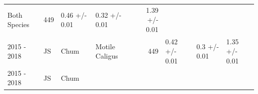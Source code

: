 \documentclass[fleqn,10pt]{wlpeerj} %
\begin{document}
\begin{longtable}[]{@{}llllrlll@{}}
\begin{minipage}[t]{0.11\columnwidth}
Both Species\strut
\end{minipage} & \begin{minipage}[t]{0.04\columnwidth}\raggedleft\strut
449\strut
\end{minipage} & \begin{minipage}[t]{0.14\columnwidth}\raggedright\strut
0.46 +/- 0.01\strut
\end{minipage} & \begin{minipage}[t]{0.14\columnwidth}\raggedright\strut
0.32 +/- 0.01\strut
\end{minipage} & \begin{minipage}[t]{0.14\columnwidth}\raggedright\strut
1.39 +/- 0.01\strut
\end{minipage}\tabularnewline
\begin{minipage}[t]{0.09\columnwidth}\raggedright\strut
2015 - 2018\strut
\end{minipage} & \begin{minipage}[t]{0.06\columnwidth}\raggedright\strut
JS\strut
\end{minipage} & \begin{minipage}[t]{0.06\columnwidth}\raggedright\strut
Chum\strut
\end{minipage} & \begin{minipage}[t]{0.11\columnwidth}\raggedright\strut
Motile Caligus\strut
\end{minipage} & \begin{minipage}[t]{0.04\columnwidth}\raggedleft\strut
449\strut
\end{minipage} & \begin{minipage}[t]{0.14\columnwidth}\raggedright\strut
0.42 +/- 0.01\strut
\end{minipage} & \begin{minipage}[t]{0.14\columnwidth}\raggedright\strut
0.3 +/- 0.01\strut
\end{minipage} & \begin{minipage}[t]{0.14\columnwidth}\raggedright\strut
1.35 +/- 0.01\strut
\end{minipage}\tabularnewline
\begin{minipage}[t]{0.09\columnwidth}\raggedright\strut
2015 - 2018\strut
\end{minipage} & \begin{minipage}[t]{0.06\columnwidth}\raggedright\strut
JS\strut
\end{minipage} & \begin{minipage}[t]{0.06\columnwidth}\raggedright\strut
Chum\strut
\end{minipage} & \begin{minipage}[t]{0.11\columnwidth}\raggedright\strut

\end{minipage}
\end{longtable}
\end{document}
